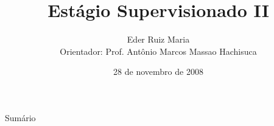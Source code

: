 \documentclass{beamer}
\title[Est\'agio Supervisionado I]{Est\'agio Supervisionado II}
\author[Eder Ruiz Maria]{Eder Ruiz Maria \\
\scriptsize{Orientador: Prof. Antônio Marcos Massao Hachisuca}}
\institute{Universidade Estadual do Oeste do Paraná}
\date{28 de novembro de 2008}
\begin{document}
\frame{\titlepage}

\begin{frame}{Sumário}
	\tableofcontents
\end{frame}

\end{document}
